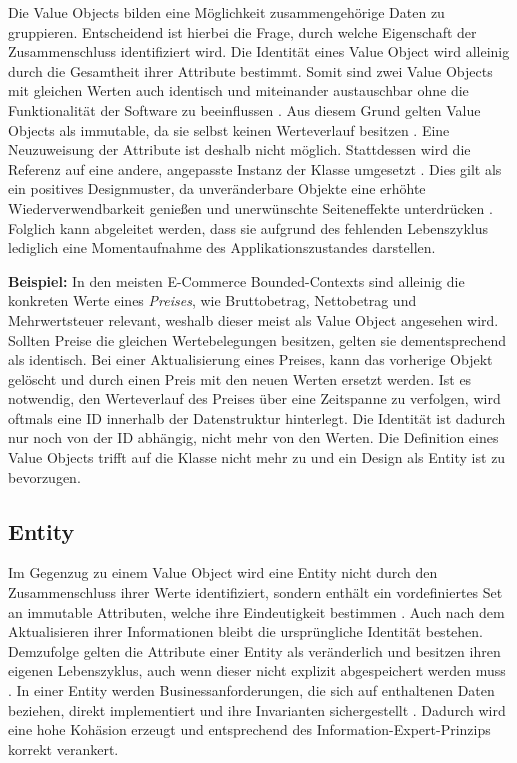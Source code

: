 Die Value Objects bilden eine Möglichkeit zusammengehörige Daten zu gruppieren. Entscheidend ist hierbei die Frage, durch welche Eigenschaft der Zusammenschluss identifiziert wird. Die Identität eines Value Object wird alleinig durch die Gesamtheit ihrer Attribute bestimmt. Somit sind zwei Value Objects mit gleichen Werten auch identisch und miteinander austauschbar ohne die Funktionalität der Software zu beeinflussen \cite[S. 227]{Vernon.2015}. Aus diesem Grund gelten Value Objects als \gls{immutable}, da sie selbst keinen Werteverlauf besitzen \cite[S. 99]{Evans.2011}. Eine Neuzuweisung der Attribute ist deshalb nicht möglich. Stattdessen wird die Referenz auf eine andere, angepasste Instanz der Klasse umgesetzt \cite[S. 226]{Vernon.2015}. Dies gilt als ein positives Designmuster, da unveränderbare Objekte eine erhöhte Wiederverwendbarkeit genießen und unerwünschte Seiteneffekte unterdrücken \cite[S. 228f.]{Vernon.2015}. Folglich kann abgeleitet werden, dass sie aufgrund des fehlenden Lebenszyklus lediglich eine Momentaufnahme des Applikationszustandes darstellen.

\textbf{Beispiel:} In den meisten E-Commerce Bounded-Contexts sind alleinig die konkreten Werte eines \emph{Preises}, wie Bruttobetrag, Nettobetrag und Mehrwertsteuer relevant, weshalb dieser meist als Value Object angesehen wird. Sollten Preise die gleichen Wertebelegungen besitzen, gelten sie dementsprechend als identisch. Bei einer Aktualisierung eines Preises, kann das vorherige Objekt gelöscht und durch einen Preis mit den neuen Werten ersetzt werden. Ist es notwendig, den Werteverlauf des Preises über eine Zeitspanne zu verfolgen, wird oftmals eine ID innerhalb der Datenstruktur hinterlegt. Die Identität ist dadurch nur noch von der ID abhängig, nicht mehr von den Werten. Die Definition eines Value Objects trifft auf die Klasse nicht mehr zu und ein Design als Entity ist zu bevorzugen.  

\subsection{Entity}

Im Gegenzug zu einem Value Object wird eine Entity nicht durch den Zusammenschluss ihrer Werte identifiziert, sondern enthält ein vordefiniertes Set an \gls{immutable} Attributen, welche ihre Eindeutigkeit bestimmen \cite[S. 94]{Evans.2011}. Auch nach dem Aktualisieren ihrer Informationen bleibt die ursprüngliche Identität bestehen. Demzufolge gelten die Attribute einer Entity als veränderlich und besitzen ihren eigenen Lebenszyklus, auch wenn dieser nicht explizit abgespeichert werden muss \cite[S. 172]{Vernon.2015}. In einer Entity werden Businessanforderungen, die sich auf enthaltenen Daten beziehen, direkt implementiert und ihre \Gls{Invariante}n sichergestellt \cite[S. 208f.]{Vernon.2015}. Dadurch wird eine hohe Kohäsion erzeugt und entsprechend des \Gls{Information-Expert-Prinzip}s korrekt verankert.

